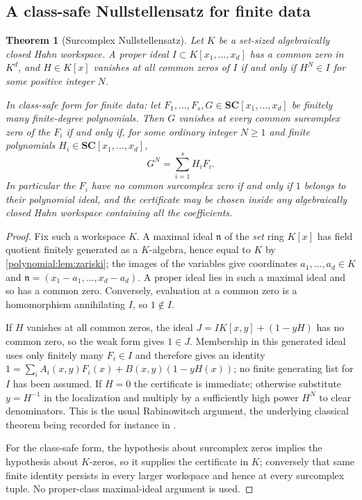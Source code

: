 \documentclass[11pt,letterpaper]{article}
\numberwithin{equation}{section}
\newtheorem{theorem}{Theorem}[section]
\theoremstyle{definition}
\theoremstyle{remark}\newtheorem{remark}[theorem]{Remark}
\newcommand{\SC}{\mathbf{SC}}
\begin{document}
\subsection{A class-safe Nullstellensatz for finite data}
\begin{theorem}[Surcomplex Nullstellensatz]\label{polynomial:thm:nullstellensatz}
Let $K$ be a set-sized algebraically closed Hahn workspace. A proper ideal
$I\subset K[x_1,\ldots,x_d]$ has a common zero in $K^d$, and $H\in K[x]$
vanishes at all common zeros of $I$ if and only if $H^N\in I$ for some
positive integer $N$.

In class-safe form for finite data: let
$F_1,\ldots,F_s,G\in\SC[x_1,\ldots,x_d]$ be finitely many finite-degree
polynomials. Then $G$ vanishes at every common surcomplex zero of the $F_i$ if
and only if, for some ordinary integer $N\ge1$ and finite polynomials
$H_i\in\SC[x_1,\ldots,x_d]$,
\begin{equation}\label{polynomial:eq:nullcertificate}
 G^N=\sum_{i=1}^sH_iF_i .
\end{equation}
In particular the $F_i$ have no common surcomplex zero if and only if $1$
belongs to their polynomial ideal, and the certificate may be chosen inside
any algebraically closed Hahn workspace containing all the coefficients.
\end{theorem}
\begin{proof}
Fix such a workspace $K$. A maximal ideal $\mathfrak n$ of the \emph{set} ring
$K[x]$ has field quotient finitely generated as a $K$-algebra, hence equal to
$K$ by \cref{polynomial:lem:zariski}; the images of the variables give
coordinates $a_1,\ldots,a_d\in K$ and $\mathfrak n=(x_1-a_1,\ldots,x_d-a_d)$.
A proper ideal lies in such a maximal ideal and so has a common zero.
Conversely, evaluation at a common zero is a homomorphism annihilating $I$, so
$1\notin I$.

If $H$ vanishes at all common zeros, the ideal
$J=I K[x,y]+(1-yH)$ has no common zero, so the weak form gives $1\in J$.
Membership in this generated ideal uses only finitely many $F_i\in I$ and
therefore gives an identity
$1=\sum_iA_i(x,y)F_i(x)+B(x,y)(1-yH(x))$; no finite generating list for $I$
has been assumed. If $H=0$ the certificate is
immediate; otherwise substitute $y=H^{-1}$ in the localization and multiply by
a sufficiently high power $H^N$ to clear denominators. This is the usual
Rabinowitsch argument, the underlying classical theorem being recorded for
instance in \cite[Tag 00FV]{polynomial:Stacks}.

For the class-safe form, the hypothesis about surcomplex zeros implies the
hypothesis about $K$-zeros, so it supplies the certificate in $K$; conversely
that same finite identity persists in every larger workspace and hence at
every surcomplex tuple. No proper-class maximal-ideal argument is used.
\end{proof}
\end{document}
